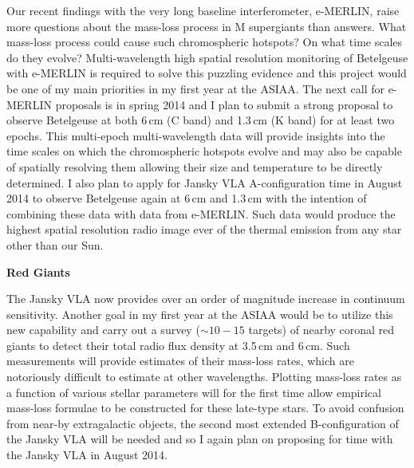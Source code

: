 \documentclass[11pt]{letter} %
\begin{document}
Our recent findings with the very long baseline interferometer, e-MERLIN, raise more questions about the mass-loss process in M supergiants than answers. What mass-loss process could cause such chromospheric hotspots? On what time scales do they evolve? Multi-wavelength high spatial resolution monitoring of Betelgeuse with e-MERLIN is required to solve this puzzling evidence and this project would be one of my main priorities in my first year at the ASIAA. The next call for e-MERLIN proposals is in spring 2014 and I plan to submit a strong proposal to observe Betelgeuse at both 6\,cm (C band) and 1.3\,cm (K band) for at least two epochs. This multi-epoch multi-wavelength data will provide insights into the time scales on which the chromospheric hotspots evolve and may also be capable of spatially resolving them allowing their size and temperature to be directly determined. I also plan to apply for Jansky VLA A-configuration time in August 2014 to observe Betelgeuse again at 6\,cm and 1.3\,cm with the intention of combining these data with data from e-MERLIN. Such data would produce the highest spatial resolution radio image ever of the thermal emission from any star other than our Sun. 
\begin{center}
\textbf{Red Giants}
\end{center}
The Jansky VLA now provides over an order of magnitude increase in continuum sensitivity. Another goal in my first year at the ASIAA would be to utilize this new capability and carry out a survey ($\sim 10 - 15$ targets) of nearby coronal red giants to detect their total radio flux density at 3.5\,cm and 6\,cm. Such measurements will provide estimates of their mass-loss rates, which are notoriously difficult to estimate at other wavelengths. Plotting mass-loss rates as a function of various stellar parameters will for the first time allow empirical mass-loss formulae to be constructed for these late-type stars. To avoid confusion from near-by extragalactic objects, the second most extended B-configuration of the Jansky VLA will be needed and so I again plan on proposing for time with the Jansky VLA in August 2014.
\end{document}
